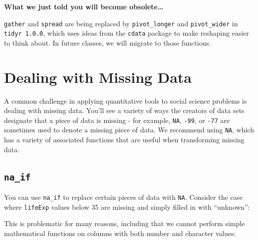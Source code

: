 \documentclass[
]{book}
\newenvironment{Shaded}{\begin{snugshade}}{\end{snugshade}}
\newcommand{\CommentTok}[1]{\textcolor[rgb]{0.56,0.35,0.01}{\textit{#1}}}
\newcommand{\DataTypeTok}[1]{\textcolor[rgb]{0.13,0.29,0.53}{#1}}
\newcommand{\DecValTok}[1]{\textcolor[rgb]{0.00,0.00,0.81}{#1}}
\newcommand{\KeywordTok}[1]{\textcolor[rgb]{0.13,0.29,0.53}{\textbf{#1}}}
\newcommand{\NormalTok}[1]{#1}
\newcommand{\OperatorTok}[1]{\textcolor[rgb]{0.81,0.36,0.00}{\textbf{#1}}}
\newcommand{\OtherTok}[1]{\textcolor[rgb]{0.56,0.35,0.01}{#1}}
\newcommand{\StringTok}[1]{\textcolor[rgb]{0.31,0.60,0.02}{#1}}
\begin{document}
\textbf{What we just told you will become obsolete\ldots{}}

\texttt{gather} and \texttt{spread} are being replaced by \texttt{pivot\_longer} and \texttt{pivot\_wider} in \texttt{tidyr\ 1.0.0}, which uses ideas from the \texttt{cdata} package to make reshaping easier to think about. In future classes, we will migrate to those functions.

\hypertarget{dealing-with-missing-data}{%
\section{Dealing with Missing Data}\label{dealing-with-missing-data}}

A common challenge in applying quantitative tools to social science problems is dealing with missing data. You'll see a variety of ways the creators of data sets designate that a piece of data is missing - for example, \texttt{NA}, \texttt{-99}, or \texttt{-77} are sometimes used to denote a missing piece of data. We recommend using \texttt{NA}, which has a variety of associated functions that are useful when transforming missing data.

\hypertarget{na_if}{%
\subsection{\texorpdfstring{\texttt{na\_if}}{na\_if}}\label{na_if}}

You can use \texttt{na\_if} to replace certain pieces of data with \texttt{NA}. Consider the case where \texttt{lifeExp} values below 35 are missing and simply filled in with ``unknown'':

\begin{Shaded}
\end{Shaded}

This is problematic for many reasons, including that we cannot perform simple mathematical functions on columns with both number and character values:

\begin{Shaded}
\end{Shaded}
\end{document}
